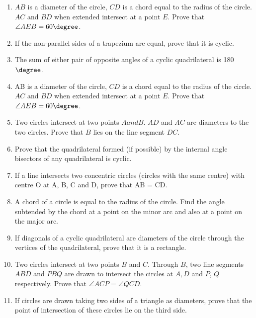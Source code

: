 \begin{enumerate}[label=\thesubsection.\arabic*,ref=\thesubsection.\theenumi]
\item $AB$ is a diameter of the circle, $CD$ is a chord equal to the radius of the circle. $AC$ and $BD$ when extended intersect at a point $E$. Prove that $\angle AEB = 60\degree$.
\item If the non-parallel sides of a trapezium are equal, prove that it is cyclic.
	\iffalse
\begin{enumerate}


\end{enumerate}
\fi
\item  The sum of either pair of opposite angles of a cyclic quadrilateral is 180$\degree$.
\item AB is a diameter of the circle, $CD$ is a chord equal to the radius of the circle. $AC$ and $BD$ when extended intersect at a point $E$. Prove that $\angle AEB = 60\degree$.
\item Two circles intersect at two points $A and B$. $AD$ and $AC$ are diameters to the two circles. Prove that $B$ lies on the line segment $DC$.
\item Prove that the quadrilateral formed (if possible) by the internal angle bisectors of any quadrilateral is cyclic.
\item If a line intersects two concentric circles (circles with the same centre) with centre O at A, B, C and D, prove that AB = CD.
	\iffalse
\begin{enumerate}


\end{enumerate}
\fi
\item A chord of a circle is equal to the radius of the
circle. Find the angle subtended by the chord at
a point on the minor arc and also at a point on the
major arc.
\item If diagonals of a cyclic quadrilateral are diameters of the circle through the vertices of
the quadrilateral, prove that it is a rectangle.
\item Two circles intersect at two points $B$ and $C$.
Through $B$, two line segments $ABD$ and $PBQ$
are drawn to intersect the circles at $A, D$ and $P$,
$Q$ respectively. Prove that
$\angle ACP = \angle QCD$.
\item If circles are drawn taking two sides of a triangle as diameters, prove that the point of
intersection of these circles lie on the third side.

\end{enumerate}
